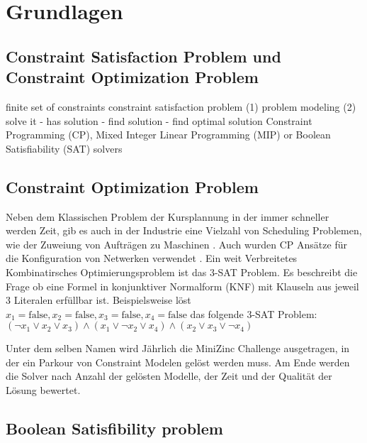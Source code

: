 
\section{Grundlagen}
\subsection{Constraint Satisfaction Problem und Constraint Optimization Problem} 
\label{sec:Constraint Satisfaction Problem und Constraint Optimization Problem}

finite set of constraints \cite[1]{aptjo} constraint satisfaction problem
\cite[1]{aptjo} (1) problem modeling (2) solve it - has solution - find solution
- find optimal solution
\cite*[postnote]{aptjo}
Constraint Programming (CP), Mixed Integer Linear Programming (MIP) or Boolean
Satisfiability (SAT) solvers



\subsection{Constraint Optimization Problem}
\label{sec: Constraint Optimization Problem}

Neben dem Klassischen Problem der Kursplannung \cite{duboi96jo} in der immer
schneller werden Zeit, gib es auch in der Industrie eine Vielzahl von Scheduling
Problemen, wie der Zuweiung von Aufträgen zu Maschinen \cite{gedik16jo}. Auch
wurden CP Ansätze für die Konfiguration von Netwerken verwendet \cite{ardisjo}.
Ein weit Verbreitetes Kombinatirsches Optimierungsproblem ist das 3-SAT Problem.
Es beschreibt die Frage ob eine Formel in konjunktiver Normalform (KNF) mit
Klauseln aus jeweil 3 Literalen erfüllbar ist.  
Beispielsweise löst 
$x_1=\mathrm{false},x_2=\mathrm{false},x_3=\mathrm{false},x_4=\mathrm{false}$
das folgende 3-SAT Problem: 
$(\lnot x_1\lor x_2\lor x_3)\land(x_1\lor\lnot x_2\lor x_4)\land(x_2\lor x_3\lor\lnot x_4)$

Unter dem selben Namen wird Jährlich die MiniZinc Challenge ausgetragen, in der
ein Parkour von Constraint Modelen gelöst werden muss. Am Ende werden die Solver
nach Anzahl der gelösten Modelle, der Zeit und der Qualität der Lösung bewertet.

\subsection{Boolean Satisfibility problem}
\label{sec: Boolean Satisfibility problem}



